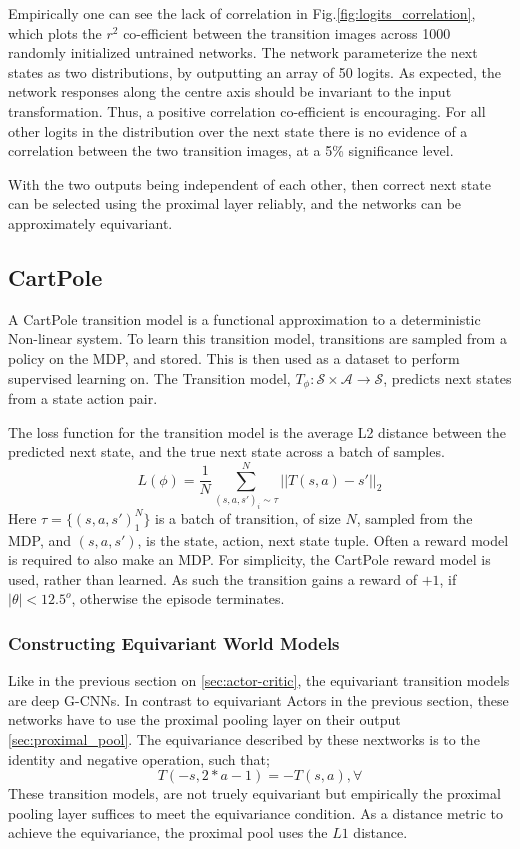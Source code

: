 Empirically one can see the lack of correlation in Fig.\ref{fig:logits_correlation}, which plots the $r^2$ co-efficient between the transition images across 1000 randomly initialized untrained networks. The network parameterize the next states as two distributions, by outputting an array of 50 logits. As expected, the network responses along the centre axis should be invariant to the input transformation. Thus, a positive correlation co-efficient is encouraging. For all other logits in the distribution over the next state there is no evidence of a correlation between the two transition images, at a 5\% significance level.

With the two outputs being independent of each other, then correct next state can be selected using the proximal layer reliably, and the networks can be approximately equivariant.



\subsection{CartPole}
A CartPole transition model is a functional approximation to a deterministic Non-linear system.
To learn this transition model, transitions are sampled from a policy on the MDP, and stored. This is then used as a dataset to perform supervised learning on. The Transition model, $T_\phi: \mathcal{S} \times \mathcal{A} \rightarrow \mathcal{S}$, predicts next states from a state action pair.

The loss function for the transition model is the average L2 distance between the predicted next state, and the true next state across a batch of samples.
\begin{equation}
	L(\phi) = \frac{1}{N}\sum^N_{(s, a, s')_i \sim \mathcal \tau} ||T(s, a) - s'||_2
\end{equation}
Here $\tau = \{(s, a , s')_1^N\}$ is a batch of transition, of size $N$, sampled from the MDP, and $(s, a, s')$, is the state, action, next state tuple. Often a reward model is required to also make an MDP. For simplicity, the CartPole reward model is used, rather than learned. As such the transition gains a reward of $+1$, if $|\theta| < 12.5^o$, otherwise the episode terminates.

\subsubsection{Constructing Equivariant World Models}
Like in the previous section on \ref{sec:actor-critic}, the equivariant transition models are deep G-CNNs. In contrast to equivariant Actors in the previous section, these networks have to use the proximal pooling layer on their output \ref{sec:proximal_pool}. The equivariance described by these nextworks is to the identity and negative operation, such that;
\begin{equation}
	T(- s, 2*a - 1) =  -T(s, a), \forall
\end{equation}
These transition models, are not truely equivariant but empirically the proximal pooling layer suffices to meet the equivariance condition. As a distance metric to achieve the equivariance, the proximal pool uses the $L1$ distance.

